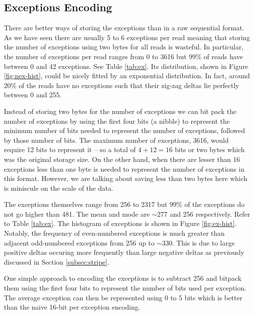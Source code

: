%

\subsection{Exceptions Encoding}

There are better ways of storing the exceptions than in a raw sequential format.
As we have seen there are usually 5 to 6 exceptions per read meaning that
storing the number of exceptions using two bytes for all reads is wasteful. In
particular, the number of exceptions per read ranges from 0 to 3616 but 99\% of
reads have between 0 and 42 exceptions. See Table \ref{tab:ex}. Its
distribution, shown in Figure \ref{fig:nex-hist}, could be nicely fitted by an
exponential distribution. In fact, around 20\% of the reads have no exceptions
such that their zig-zag deltas lie perfectly between 0 and 255.




Instead of storing two bytes for the number of exceptions we can bit pack the
number of exceptions by using the first four bits (a nibble) to represent the
minimum number of bits needed to represent the number of exceptions, followed
by those number of bits. The maximum number of exceptions, 3616, would require
12 bits to represent it -- so a total of $4+12=16$ bits or two bytes which was
the original storage size. On the other hand, when there are lesser than 16
exceptions less than one byte is needed to represent the number of exceptions in
this format.  However, we are talking about saving less than two bytes here
which is miniscule on the scale of the data.

The exceptions themselves range from 256 to 2317 but 99\% of the exceptions do
not go higher than 481. The mean and mode are $\sim$277 and 256 respectively.
Refer to Table \ref{tab:ex}. The histogram of exceptions is shown in Figure
\ref{fig:ex-hist}. Notably, the frequency of even-numbered exceptions is much
greater than adjacent odd-numbered exceptions from 256 up to $\sim$330. This is
due to large positive deltas occuring more frequently than large negative deltas
as previously discussed in Section \ref{subsec:stripe}.



One simple approach to encoding the exceptions is to subtract 256 and bitpack
them using the first four bits to represent the number of bits used per
exception. The average exception can then be represented using 0 to 5 bits which
is better than the naive 16-bit per exception encoding.

